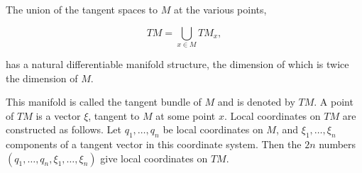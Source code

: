 The union of the tangent spaces to $M$ at the various points,

$$TM = \bigcup_{x \in M} TM_x,$$

has a natural differentiable manifold structure, the dimension of which is twice the dimension of $M$.

This manifold is called the tangent bundle of $M$ and is denoted by $TM$. A point of $TM$ is a vector $\xi$, tangent to $M$ at some point $x$. Local coordinates on $TM$ are constructed as follows. Let $q_1, \ldots, q_n$ be local coordinates on $M$, and $\xi_1, \ldots, \xi_n$ components of a tangent vector in this coordinate system. Then the $2n$ numbers $(q_1, \ldots, q_n, \xi_1, \ldots, \xi_n)$ give local coordinates on $TM$.
